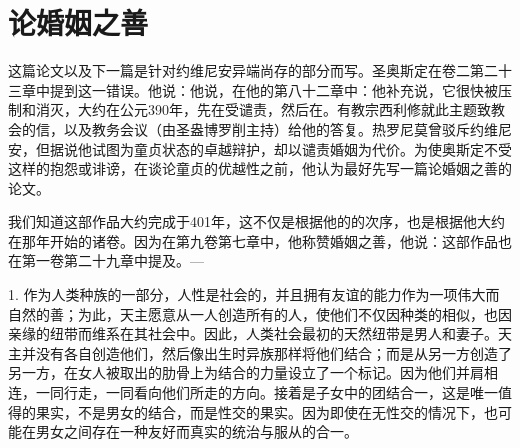 
\chapter{论婚姻之善}


这篇论文以及下一篇是针对约维尼安异端尚存的部分而写。圣奥斯定在卷二第二十三章中提到这一错误。他说：他说，在他的第八十二章中：他补充说，它很快被压制和消灭，大约在公元390年，先在受谴责，然后在。有教宗西利修就此主题致教会的信，以及教务会议（由圣盎博罗削主持）给他的答复。热罗尼莫曾驳斥约维尼安，但据说他试图为童贞状态的卓越辩护，却以谴责婚姻为代价。为使奥斯定不受这样的抱怨或诽谤，在谈论童贞的优越性之前，他认为最好先写一篇论婚姻之善的论文。\par

我们知道这部作品大约完成于401年，这不仅是根据他的的次序，也是根据他大约在那年开始的诸卷。因为在第九卷第七章中，他称赞婚姻之善，他说：这部作品也在第一卷第二十九章中提及。— \par

1. 作为人类种族的一部分，人性是社会的，并且拥有友谊的能力作为一项伟大而自然的善；为此，天主愿意从一人创造所有的人，使他们不仅因种类的相似，也因亲缘的纽带而维系在其社会中。因此，人类社会最初的天然纽带是男人和妻子。天主并没有各自创造他们，然后像出生时异族那样将他们结合；而是从另一方创造了另一方，在女人被取出的肋骨上为结合的力量设立了一个标记。因为他们并肩相连，一同行走，一同看向他们所走的方向。接着是子女中的团结合一，这是唯一值得的果实，不是男女的结合，而是性交的果实。因为即使在无性交的情况下，也可能在男女之间存在一种友好而真实的统治与服从的合一。\par


